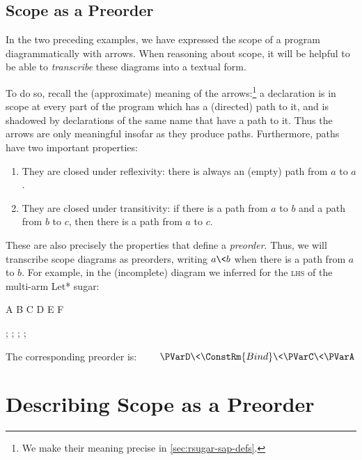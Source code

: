 \subsection{Scope as a Preorder}

In the two preceding examples, we have expressed the scope of a program
diagrammatically with arrows. When reasoning about scope, it will be
helpful to be able to \emph{transcribe} these diagrams into a
textual form.

To do so, recall the (approximate) meaning of the arrows:\footnote{
  We make their meaning precise in \cref{sec:rsugar-sap-defs}.
}
a declaration is in scope at every part of the program which has a
(directed) path to it, and is shadowed by declarations of the same name
that have a path to it. Thus the arrows are only meaningful insofar as
they produce paths. Furthermore, paths have two important properties:
\begin{enumerate}
  \item They are closed under reflexivity: there is always an (empty) path
    from $a$ to $a$.
  \item They are closed under transitivity: if there is a path from
    $a$ to $b$ and a path from $b$ to $c$, then there is a path from
    $a$ to $c$.
\end{enumerate}
These are also precisely the properties that define a \emph{preorder}.
Thus, we will transcribe scope diagrams as preorders, writing $a \< b$
when there is a path from $a$ to $b$.
For example, in the (incomplete) diagram we inferred for the \textsc{lhs} of the
multi-arm Let* sugar:
\begin{center}
\begin{tikzScopeDiagram}[simple]
  \tikzRoot
    {A}{
      {B}{
        {C}{\tikzChild{$\PVarA$}}
        {D}{\tikzChild{$\PVarB$}}
        {E}{\tikzChild{$\PVarC$}}}
      {F}{\tikzChild{$\PVarD$}}}
  \begin{tikzEdges}
    ;
    ;
    ;
    ;
  \end{tikzEdges}
\end{tikzScopeDiagram}
\end{center}
The corresponding preorder is:
$\hspace{2em} \PVarD \< \ConstRm{Bind} \< \PVarC \< \PVarA$



\section{Describing Scope as a Preorder}
\label{sec:rscope-sap}


